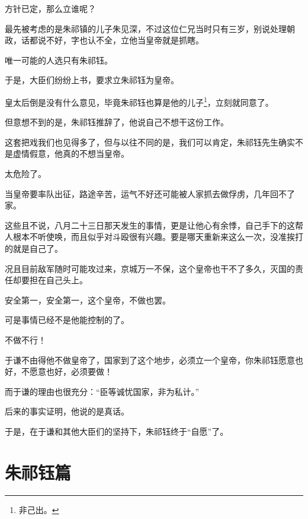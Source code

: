 \begin{multicols}{\theparacolNo}
方针已定，那么立谁呢？

最先被考虑的是朱祁镇的儿子朱见深，不过这位仁兄当时只有三岁，别说处理朝政，话都说不好，字也认不全，立他当皇帝就是抓瞎。

唯一可能的人选只有朱祁钰。

于是，大臣们纷纷上书，要求立朱祁钰为皇帝。

皇太后倒是没有什么意见，毕竟朱祁钰也算是他的儿子\footnote{非己出。}，立刻就同意了。

但意想不到的是，朱祁钰推辞了，他说自己不想干这份工作。

这套把戏我们也见得多了，但与以往不同的是，我们可以肯定，朱祁钰先生确实不是虚情假意，他真的不想当皇帝。

太危险了。

当皇帝要率队出征，路途辛苦，运气不好还可能被人家抓去做俘虏，几年回不了家。

这些且不说，八月二十三日那天发生的事情，更是让他心有余悸，自己手下的这帮人根本不听使唤，而且似乎对斗殴很有兴趣。要是哪天重新来这么一次，没准挨打的就是自己了。

况且目前敌军随时可能攻过来，京城万一不保，这个皇帝也干不了多久，灭国的责任却要担在自己头上。

安全第一，安全第一，这个皇帝，不做也罢。

可是事情已经不是他能控制的了。

不做不行！

于谦不由得他不做皇帝了，国家到了这个地步，必须立一个皇帝，你朱祁钰愿意也好，不愿意也好，必须要做！

而于谦的理由也很充分：“臣等诚忧国家，非为私计。”

后来的事实证明，他说的是真话。

于是，在于谦和其他大臣们的坚持下，朱祁钰终于“自愿”了。
\ifnum{}
	\end{multicols}
\fi
\newpage
\chapter*{朱祁钰篇}
